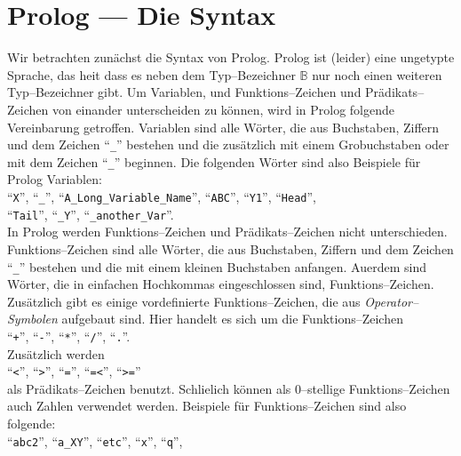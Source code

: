 \section{Prolog --- Die Syntax}
Wir betrachten zun\"{a}chst die Syntax von Prolog.
Prolog ist (leider) eine ungetypte Sprache, das hei\3t dass es neben dem Typ--Bezeichner
$\mathbb{B}$ nur noch einen weiteren Typ--Bezeichner gibt.  Um Variablen, und
Funktions--Zeichen und Pr\"{a}dikats--Zeichen
von einander unterscheiden zu k\"{o}nnen, wird in Prolog folgende Vereinbarung getroffen. 
Variablen sind alle W\"{o}rter, die aus Buchstaben, Ziffern und dem Zeichen ``\texttt{\_}''
bestehen und die zus\"{a}tzlich mit einem Gro\3buchstaben oder mit dem Zeichen ``\texttt{\_}''
beginnen.  Die folgenden W\"{o}rter sind also Beispiele f\"{u}r Prolog Variablen: 
\\[0.1cm]
\hspace*{1.3cm} ``\texttt{X}'', ``\texttt{\_}'', ``\texttt{A\_Long\_Variable\_Name}'',
                ``\texttt{ABC}'', ``\texttt{Y1}'', ``\texttt{Head}'', \\[0.1cm]
\hspace*{1.3cm} ``\texttt{Tail}'', ``\texttt{\_Y}'', ``\texttt{\_another\_Var}''. \\[0.1cm]
In Prolog werden Funktions--Zeichen und Pr\"{a}dikats--Zeichen nicht unterschieden.
Funktions--Zeichen sind alle W\"{o}rter, die aus Buchstaben, Ziffern und dem Zeichen ``\texttt{\_}''
bestehen und die mit einem kleinen Buchstaben anfangen.  Au\3erdem sind W\"{o}rter, die in
einfachen Hochkommas eingeschlossen sind, Funktions--Zeichen.  Zus\"{a}tzlich gibt es einige
vordefinierte Funktions--Zeichen, die aus \emph{Operator--Symbolen} aufgebaut sind.
Hier handelt es sich um die Funktions--Zeichen \\[0.1cm]
\hspace*{1.3cm} 
``\texttt{+}'',
``\texttt{-}'',
``\texttt{*}'',
``\texttt{/}'',
``\texttt{.}''. \\[0.1cm]
Zus\"{a}tzlich werden \\[0.1cm]
\hspace*{1.3cm} 
``\texttt{<}'',
``\texttt{>}'',
``\texttt{=}'',
``\texttt{=<}'',
``\texttt{>=}'' \\[0.1cm]
als Pr\"{a}dikats--Zeichen benutzt.  Schlie\3lich k\"{o}nnen als 0--stellige Funktions--Zeichen auch
Zahlen verwendet werden.
Beispiele f\"{u}r Funktions--Zeichen sind also folgende: \\[0.1cm]
\hspace*{1.3cm}  ``\texttt{abc2}'', ``\texttt{a\_XY}'', ``\texttt{etc}'', ``\texttt{x}'', ``\texttt{q}'', 
